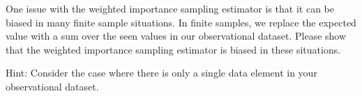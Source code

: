 \item {}  One issue with the weighted importance sampling estimator is that it can be biased in many finite sample situations. In finite samples, we replace the expected value with a sum over the seen values in our observational dataset. Please show that the weighted importance sampling estimator is biased in these situations.

Hint: Consider the case where there is only a single data element in your observational dataset.